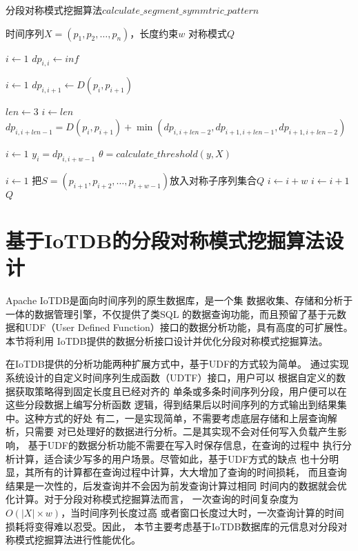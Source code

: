 \begin{algorithm}
  \caption{分段对称模式挖掘算法$calculate\_segment\_symmtric\_pattern$}
  \label{alg:symmetric_pattern}
  \small
  \begin{algorithmic}
    \REQUIRE 时间序列$X=\left(p_{1}, p_{2}, \dots, p_{n}\right)$，长度约束$w$
    \ENSURE 对称模式$Q$

    \STATE $i \leftarrow 1$
    \STATE $dp_{i,i} \leftarrow inf$
    \ENDWHILE

    \STATE $i \leftarrow 1$
    \STATE $dp_{i,i+1} \leftarrow D\left(p_{i}, p_{i+1}\right)$
    \ENDWHILE

    \STATE $len \leftarrow 3$
    \STATE $i \leftarrow len$
    \STATE $dp_{i,i+len-1} = D\left(p_{i}, p_{i+1}\right)+\min \left(dp_{i,i+len-2},dp_{i+1,i+len-1},dp_{i+1,i+len-2}\right)$
    \ENDWHILE
    \ENDWHILE

    \STATE $i \leftarrow 1$
    \STATE $y_i=dp_{i,i+w-1}$
    \ENDWHILE
    \STATE $\theta = calculate\_threshold\left(y,X\right)$

    \STATE $i \leftarrow 1$
    \STATE 把$S=\left(p_{i+1}, p_{i+2}, \dots, p_{i+w-1}\right)$放入对称子序列集合$Q$
    \STATE $i \leftarrow i+w$
    \ELSE
    \STATE $i \leftarrow i+1$
    \ENDIF
    \ENDWHILE
    \RETURN $Q$
  \end{algorithmic}
\end{algorithm}

\section{基于IoTDB的分段对称模式挖掘算法设计}

Apache IoTDB是面向时间序列的原生数据库，是一个集
数据收集、存储和分析于一体的数据管理引擎，不仅提供了类SQL
的数据查询功能，而且预留了基于元数据和UDF（User Defined 
Function）接口的数据分析功能，具有高度的可扩展性。本节将利用
IoTDB提供的数据分析接口设计并优化分段对称模式挖掘算法。

在IoTDB提供的分析功能两种扩展方式中，基于UDF的方式较为简单。
通过实现系统设计的自定义时间序列生成函数（UDTF）接口，用户可以
根据自定义的数据获取策略得到固定长度且已经对齐的
单条或多条时间序列分段，用户便可以在这些分段数据上编写分析函数
逻辑，得到结果后以时间序列的方式输出到结果集中。这种方式的好处
有二，一是实现简单，不需要考虑底层存储和上层查询解析，只需要
对已处理好的数据进行分析。二是其实现不会对任何写入负载产生影响，
基于UDF的数据分析功能不需要在写入时保存信息，在查询的过程中
执行分析计算，适合读少写多的用户场景。尽管如此，基于UDF方式的缺点
也十分明显，其所有的计算都在查询过程中计算，大大增加了查询的时间损耗，
而且查询结果是一次性的，后发查询并不会因为前发查询计算过相同
时间内的数据就会优化计算。对于分段对称模式挖掘算法而言，
一次查询的时间复杂度为$O(|X| \times w)$，当时间序列长度过高
或者窗口长度过大时，一次查询计算的时间损耗将变得难以忍受。因此，
本节主要考虑基于IoTDB数据库的元信息对分段对称模式挖掘算法进行性能优化。

